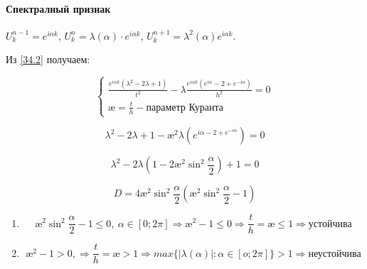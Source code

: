 \documentclass[__main__.tex]{subfiles}
\begin{document}
\paragraph{Спектралный признак}

$U^{n-1}_k = e^{i \alpha k}$, $U^n_k = \lambda\left(\alpha\right) \cdot e^{i \alpha k}$, $U^{n+1}_k = \lambda^2 \left(\alpha\right) e^{i \alpha k}$.

Из \ref{34.2} получаем:

\begin{equation}
\begin{cases}
\frac{e^{i\alpha k} \left(\lambda^2 - 2 \lambda + 1\right)}{t^2} - \lambda \frac{e^{i \alpha k} \left(e^{i\alpha} - 2 + e^{-i\alpha}\right)}{h^2} = 0 \\
\text{\ae} = \frac{t}{h} - \text{параметр Куранта}
\end{cases}
\end{equation}

$$
\lambda^2 - 2 \lambda + 1 - \text{\ae}^2 \lambda \left(e^{i\alpha - 2 + e^{-i \alpha}}\right) = 0
$$

$$
\lambda^2 - 2 \lambda \left( 1 - 2\text{\ae}^2 \sin^2 \frac{\alpha}{2} \right) + 1 = 0
$$

$$
D = 4 \text{\ae}^2 \sin^2 \frac{\alpha}{2} \left(\text{\ae}^2 \sin^2 \frac{\alpha}{2} - 1 \right)
$$

\begin{enumerate}
	\item 
	$$
	\text{\ae}^2 \sin^2 \frac{\alpha}{2} - 1 \leq 0, \ \alpha \in [0;2\pi] \Rightarrow \text{\ae}^2 - 1 \leq 0 \Rightarrow \frac{t}{h} = \text{\ae} \leq 1 \Rightarrow \text{устойчива}
	$$
	
	\item 
	$$
	\text{\ae}^2 - 1 > 0, \Rightarrow \frac{t}{h} = \text{\ae} > 1 \Rightarrow max \{ \left|\lambda \left(\alpha\right)\right|: \alpha \in[o;2\pi] \} > 1 \Rightarrow \text{неустойчива}
	$$
\end{enumerate}
\end{document}
